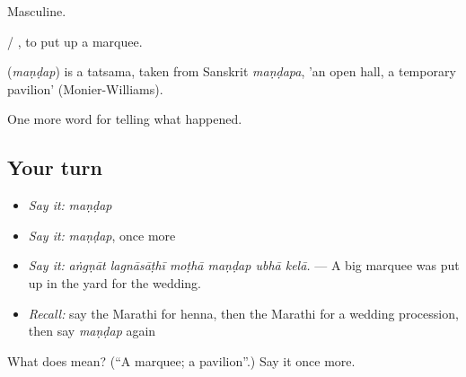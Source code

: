 Masculine.

   / , to put up a marquee.

\begin{cousinweb}
\textbf{} (\emph{maṇḍap}) is a tatsama, taken from Sanskrit \emph{maṇḍapa}, 'an open hall, a temporary pavilion' (Monier-Williams).
\end{cousinweb}

\begin{grammarlens}[title={What you've built}]
One more word for telling what happened.
\end{grammarlens}

\subsection*{Your turn}
\begin{itemize}
\raggedright
  \item \emph{Say it:} \emph{maṇḍap}
  \item \emph{Say it:} \emph{maṇḍap}, once more
  \item \emph{Say it:} \emph{aṅgṇāt lagnāsāṭhī moṭhā maṇḍap ubhā kelā.} — A big marquee was put up in the yard for the wedding.
  \item \emph{Recall:} say the Marathi for henna, then the Marathi for a wedding procession, then say \emph{maṇḍap} again
\end{itemize}

\begin{tcolorbox}[breakable,colback=teal!4,colframe=teal!35!black,title={Before you move on}]
What does  mean? (\textquotedblleft{}A marquee; a pavilion\textquotedblright{}.) Say it once more.
\end{tcolorbox}
